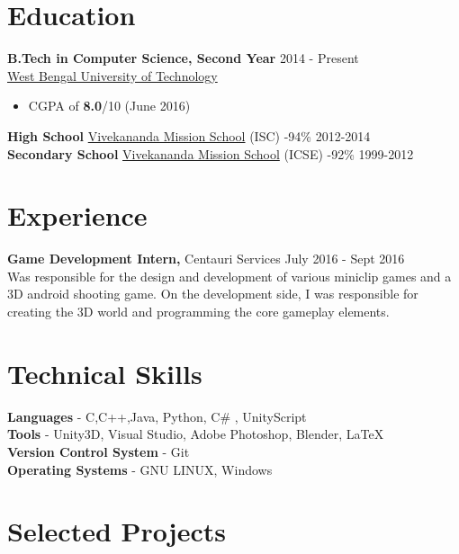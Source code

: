 \documentclass[margin, centered]{res}
\begin{document}
\begin{resume}

\section{Education}
\textbf{B.Tech in Computer Science, Second Year} \hfill 2014 - Present\\
\href{http://www.wbut.ac.in/}{West Bengal University of Technology}

\begin{itemize}
 \item CGPA of \textbf{8.0}/10 (June 2016)
\end{itemize}
\textbf{High School} \href{http://www.vmskolkata.org/}{Vivekananda Mission School} (ISC) -94\% \hfill 2012-2014\\
\textbf{Secondary School} \href{http://www.vmskolkata.org/}{Vivekananda Mission School} (ICSE) -92\% \hfill 1999-2012

\section{Experience}
\textbf{Game Development Intern,} Centauri Services \hfill July 2016 - Sept 2016\\
Was responsible for the design and development of various miniclip games and a 3D android shooting game. On the development side, I was responsible for creating the 3D world and programming the core gameplay elements.
\section{Technical Skills}
\textbf{Languages} - C,C++,Java, Python, C\# , UnityScript \\
\textbf{Tools} - Unity3D, Visual Studio, Adobe Photoshop, Blender, \LaTeX \\
\textbf{Version Control System} - Git \\
\textbf{Operating Systems} - GNU LINUX, Windows
\section{Selected Projects}


\end{resume}
\end{document}
